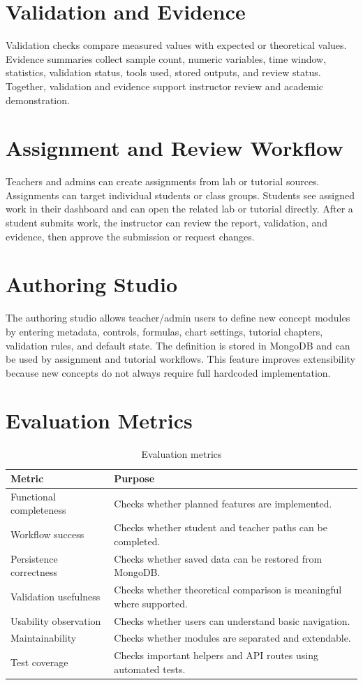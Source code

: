 \documentclass[12pt,a4paper]{report}
\begin{document}
\section{Validation and Evidence}
Validation checks compare measured values with expected or theoretical values. Evidence summaries collect sample count, numeric variables, time window, statistics, validation status, tools used, stored outputs, and review status. Together, validation and evidence support instructor review and academic demonstration.

\section{Assignment and Review Workflow}
Teachers and admins can create assignments from lab or tutorial sources. Assignments can target individual students or class groups. Students see assigned work in their dashboard and can open the related lab or tutorial directly. After a student submits work, the instructor can review the report, validation, and evidence, then approve the submission or request changes.

\section{Authoring Studio}
The authoring studio allows teacher/admin users to define new concept modules by entering metadata, controls, formulas, chart settings, tutorial chapters, validation rules, and default state. The definition is stored in MongoDB and can be used by assignment and tutorial workflows. This feature improves extensibility because new concepts do not always require full hardcoded implementation.

\section{Evaluation Metrics}
\begin{table}[H]
\centering
\caption{Evaluation metrics}
\begin{tabular}{p{} p{}}
\toprule
\textbf{Metric} & \textbf{Purpose} \\
\midrule
Functional completeness & Checks whether planned features are implemented. \\
Workflow success & Checks whether student and teacher paths can be completed. \\
Persistence correctness & Checks whether saved data can be restored from MongoDB. \\
Validation usefulness & Checks whether theoretical comparison is meaningful where supported. \\
Usability observation & Checks whether users can understand basic navigation. \\
Maintainability & Checks whether modules are separated and extendable. \\
Test coverage & Checks important helpers and API routes using automated tests. \\
\bottomrule
\end{tabular}
\end{table}
\end{document}
